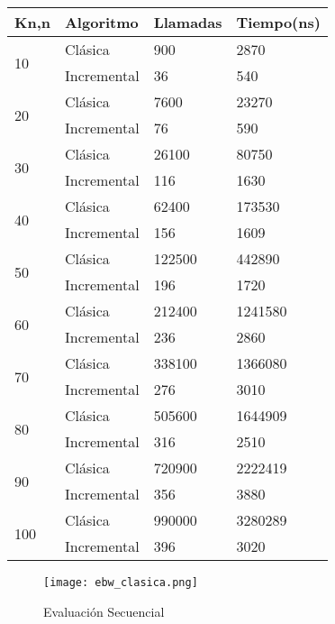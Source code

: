 \documentclass[
	letterpaper, %
	10pt, %
]{CSUniSchoolLabReport}
\begin{document}
\begin{table}[H]
\centering
\begin{tabular}{|l|l|l|l|}
\hline
Kn,n                & Algoritmo   & Llamadas & Tiempo(ns)  \\ \hline
\multirow{2}{*}{10} & Clásica     & 900      & 2870    \\ \cline{2-4} 
                    & Incremental & 36       & 540     \\ \hline
\multirow{2}{*}{20} & Clásica     & 7600     & 23270   \\ \cline{2-4} 
                    & Incremental & 76       & 590     \\ \hline
\multirow{2}{*}{30} & Clásica     & 26100    & 80750   \\ \cline{2-4} 
                    & Incremental & 116      & 1630    \\ \hline
\multirow{2}{*}{40} & Clásica     & 62400    & 173530  \\ \cline{2-4} 
                    & Incremental & 156      & 1609    \\ \hline
\multirow{2}{*}{50} & Clásica     & 122500   & 442890  \\ \cline{2-4} 
                    & Incremental & 196      & 1720    \\ \hline
\multirow{2}{*}{60} & Clásica     & 212400   & 1241580 \\ \cline{2-4} 
                    & Incremental & 236      & 2860    \\ \hline
\multirow{2}{*}{70} & Clásica     & 338100   & 1366080 \\ \cline{2-4} 
& Incremental & 276      & 3010    \\ \hline

\multirow{2}{*}{80} & Clásica     & 505600   & 1644909 \\ \cline{2-4} 
& Incremental & 316      & 2510    \\ \hline
\multirow{2}{*}{90} & Clásica     & 720900   & 2222419 \\ \cline{2-4} 
& Incremental & 356      & 3880    \\ \hline
\multirow{2}{*}{100} & Clásica     & 990000   & 3280289 \\ \cline{2-4} 
& Incremental & 396      & 3020    \\ \hline
\end{tabular}
\end{table}

\begin{figure}[H] %
	\centering %
	\texttt{[image: ebw\_clasica.png]} %
	\caption{Evaluación Secuencial}
\end{figure}
\end{document}
